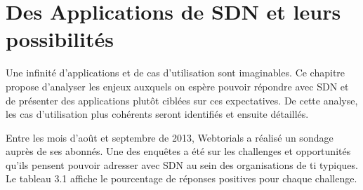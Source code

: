 
\chapter{Des Applications de SDN et leurs possibilités}


Une infinité d'applications et de cas d'utilisation sont imaginables. Ce chapitre propose d'analyser les enjeux auxquels on espère pouvoir répondre avec SDN et de présenter des applications plutôt ciblées sur ces expectatives. De cette analyse, les cas d'utilisation plus cohérents seront identifiés et ensuite détaillés.

 

Entre les mois d'août et septembre de 2013, Webtorials a réalisé un sondage auprès de ses abonnés. Une des enquêtes a été sur les challenges et opportunités qu'ils pensent pouvoir adresser avec SDN au sein des organisations de \gls{ti} typiques. Le tableau 3.1 affiche le pourcentage de réponses positives pour chaque challenge. \cite{2013GuideSDNNVUseCases}

